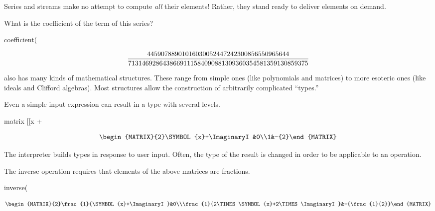 Series and streams make no attempt to compute {\it all} their elements!
Rather, they stand ready to deliver elements on demand.

%
\begin{xtc}
\begin{xtccomment}
What is the coefficient of the 
term of this series?
\end{xtccomment}
\begin{spadsrc}
coefficient(%
\end{spadsrc}
\begin{TeXOutput}
$$
\frac{44590788901016030052 44724230085655096564 4}{%
71314692864386691115 84090881309360354581 359130859375}%
$$
\end{TeXOutput}
\end{xtc}


\Language{} also has many kinds of mathematical structures.
These range from simple ones (like polynomials and matrices) to
more esoteric ones (like ideals and Clifford algebras).
Most structures allow the construction of arbitrarily complicated
``types.''

%
\begin{xtc}
\begin{xtccomment}
Even a simple input expression can
result in a type with several levels.
\end{xtccomment}
\begin{spadsrc}
matrix [[x + %
\end{spadsrc}
\begin{TeXOutput}
$$
\begin{MATRIX}{2}\SYMBOL{x}+\ImaginaryI &0\\1&-{2}\end{MATRIX}%
$$
\end{TeXOutput}
\end{xtc}

The \Language{} interpreter builds types in response to user
input.
Often, the type of the result is changed in order to be applicable
to an operation.

%
\begin{xtc}
\begin{xtccomment}
The inverse operation requires that elements of the above matrices
are fractions.
\end{xtccomment}
\begin{spadsrc}
inverse(%
\end{spadsrc}
\begin{TeXOutput}
$$
\begin{MATRIX}{2}\frac{1}{\SYMBOL{x}+\ImaginaryI }&0\\\frac{1}{2\TIMES %
\SYMBOL{x}+2\TIMES \ImaginaryI }&-{\frac{1}{2}}\end{MATRIX}%
$$
\end{TeXOutput}
\end{xtc}

